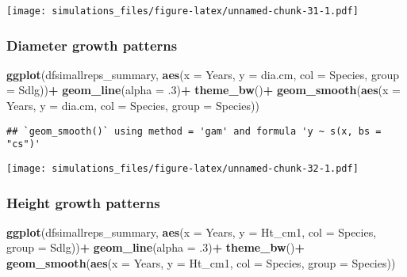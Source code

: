 \documentclass[]{article}
\newenvironment{Shaded}{\begin{snugshade}}{\end{snugshade}}
\newcommand{\KeywordTok}[1]{\textcolor[rgb]{0.13,0.29,0.53}{\textbf{#1}}}
\newcommand{\DataTypeTok}[1]{\textcolor[rgb]{0.13,0.29,0.53}{#1}}
\newcommand{\DecValTok}[1]{\textcolor[rgb]{0.00,0.00,0.81}{#1}}
\newcommand{\StringTok}[1]{\textcolor[rgb]{0.31,0.60,0.02}{#1}}
\newcommand{\OperatorTok}[1]{\textcolor[rgb]{0.81,0.36,0.00}{\textbf{#1}}}
\newcommand{\NormalTok}[1]{#1}
\begin{document}
\texttt{[image: simulations\_files/figure-latex/unnamed-chunk-31-1.pdf]}

\subsubsection{Diameter growth
patterns}\label{diameter-growth-patterns-1}

\begin{Shaded}
\begin{Highlighting}[]
\KeywordTok{ggplot}\NormalTok{(dfsimallreps_summary, }\KeywordTok{aes}\NormalTok{(}\DataTypeTok{x =}\NormalTok{ Years, }\DataTypeTok{y =}\NormalTok{ dia.cm, }\DataTypeTok{col =}\NormalTok{ Species, }\DataTypeTok{group =}\NormalTok{ Sdlg))}\OperatorTok{+}
\StringTok{  }\KeywordTok{geom_line}\NormalTok{(}\DataTypeTok{alpha =}\NormalTok{ .}\DecValTok{3}\NormalTok{)}\OperatorTok{+}
\StringTok{  }\KeywordTok{theme_bw}\NormalTok{()}\OperatorTok{+}
\StringTok{  }\KeywordTok{geom_smooth}\NormalTok{(}\KeywordTok{aes}\NormalTok{(}\DataTypeTok{x =}\NormalTok{ Years, }\DataTypeTok{y =}\NormalTok{ dia.cm, }\DataTypeTok{col =}\NormalTok{ Species, }\DataTypeTok{group =}\NormalTok{ Species))}
\end{Highlighting}
\end{Shaded}

\begin{verbatim}
## `geom_smooth()` using method = 'gam' and formula 'y ~ s(x, bs = "cs")'
\end{verbatim}

\texttt{[image: simulations\_files/figure-latex/unnamed-chunk-32-1.pdf]}

\subsubsection{Height growth patterns}\label{height-growth-patterns-1}

\begin{Shaded}
\begin{Highlighting}[]
\KeywordTok{ggplot}\NormalTok{(dfsimallreps_summary, }\KeywordTok{aes}\NormalTok{(}\DataTypeTok{x =}\NormalTok{ Years, }\DataTypeTok{y =}\NormalTok{ Ht_cm1, }\DataTypeTok{col =}\NormalTok{ Species, }\DataTypeTok{group =}\NormalTok{ Sdlg))}\OperatorTok{+}
\StringTok{  }\KeywordTok{geom_line}\NormalTok{(}\DataTypeTok{alpha =}\NormalTok{ .}\DecValTok{3}\NormalTok{)}\OperatorTok{+}
\StringTok{  }\KeywordTok{theme_bw}\NormalTok{()}\OperatorTok{+}
\StringTok{  }\KeywordTok{geom_smooth}\NormalTok{(}\KeywordTok{aes}\NormalTok{(}\DataTypeTok{x =}\NormalTok{ Years, }\DataTypeTok{y =}\NormalTok{ Ht_cm1, }\DataTypeTok{col =}\NormalTok{ Species, }\DataTypeTok{group =}\NormalTok{ Species))}
\end{Highlighting}
\end{Shaded}
\end{document}
